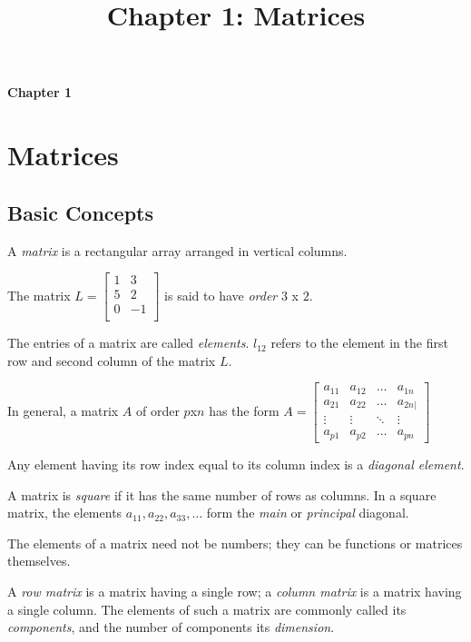 \documentclass[11pt]{article}
\theoremstyle{definition}
\begin{document}
	\setcounter{section}{0}
	\title{Chapter 1: Matrices}
	
	\thispagestyle{empty}
	
	\begin{center}
		{\LARGE \bf Chapter 1}\\
	\end{center}

	\section{Matrices}
	\subsection{Basic Concepts}
	
	A \textit{matrix} is a rectangular array arranged in vertical columns.
	
	The matrix $L =
	\begin{bmatrix}
	1 & 3 \\
	5 & 2 \\
	0 & -1 \\
	\end{bmatrix} $ is said to have \textit{order} $3$ x $2$.
	
	The entries of a matrix are called \textit{elements}. $l_{1 2}$ refers to the element in the first row and second column of the matrix $L$.
	
	In general, a matrix $A$ of order $p$x$n$ has the form $A = \begin{bmatrix}
	a_{11} & a_{12} & \dots & a_{1n} \\
	a_{21} & a_{22} & \dots & a_{2n|} \\
	\vdots & \vdots & \ddots & \vdots \\
	a_{p1} & a_{p2} & \dots & a_{pn}
	\end{bmatrix} $
	
	Any element having its row index equal to its column index is a \textit{diagonal element}.
	
	A matrix is \textit{square} if it has the same number of rows as columns. In a square matrix, the elements $a_{11}, a_{22}, a_{33}, \dots$ form the \textit{main} or \textit{principal} diagonal.
	
	The elements of a matrix need not be numbers; they can be functions or matrices themselves.
	
	A \textit{row matrix} is a matrix having a single row; a \textit{column matrix} is a matrix having a single column. The elements of such a matrix are commonly called its \textit{components}, and the number of components its \textit{dimension}. 
	
\end{document}
